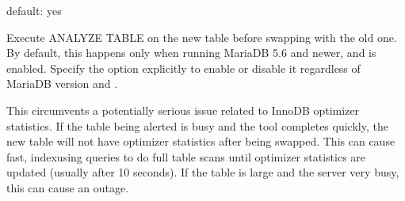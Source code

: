 \documentclass[letterpaper,10pt,english]{sphinxmanual}
\begin{document}

\begin{fulllineitems}
\label{\detokenize{mariadb-schema-change:cmdoption-mariadb-schema-change-no-analyze-before-swap}}
default: yes

Execute ANALYZE TABLE on the new table before swapping with the old one.
By default, this happens only when running MariaDB 5.6 and newer, and
 is enabled. Specify the option explicitly to enable
or disable it regardless of MariaDB version and .

This circumvents a potentially serious issue related to InnoDB optimizer
statistics. If the table being alerted is busy and the tool completes quickly,
the new table will not have optimizer statistics after being swapped. This can
cause fast, index\sphinxhyphen{}using queries to do full table scans until optimizer
statistics are updated (usually after 10 seconds). If the table is large and
the server very busy, this can cause an outage.

\end{fulllineitems}

\end{document}
